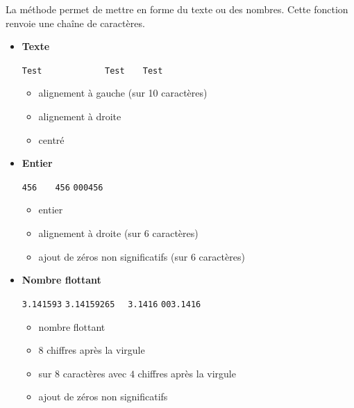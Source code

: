 \documentclass[11pt,class=report,crop=false]{standalone}
\begin{document}
La méthode  permet de mettre en forme du texte ou des nombres. Cette fonction renvoie une chaîne de caractères.

\begin{itemize}
  \item \textbf{Texte}
  
  \begin{center}
 \lstinline[showspaces=true]!Test      ! \qquad\qquad
    \lstinline[showspaces=true]!      Test!  \qquad\qquad
 \lstinline[showspaces=true]!   Test   !   
 \end{center}
 
  \begin{itemize}
    \item {} \quad alignement à gauche (sur 10 caractères)
    \item {} \quad alignement à droite
    \item {} \quad centré 
  \end{itemize}

  \item \textbf{Entier}
  
  \begin{center}
 \lstinline[showspaces=true]!456! \qquad\qquad
    \lstinline[showspaces=true]!   456!  \qquad\qquad
 \lstinline[showspaces=true]!000456!   
 \end{center}
 
  \begin{itemize}
    \item {} \quad entier  
    \item {} \quad alignement à droite (sur 6 caractères)
    \item {} \quad ajout de zéros non significatifs  (sur 6 caractères)
  \end{itemize} 
  
  \item \textbf{Nombre flottant}
  
  \begin{center}
 \lstinline[showspaces=true]!3.141593! \qquad\qquad
    \lstinline[showspaces=true]!3.14159265!  \qquad\qquad
 \lstinline[showspaces=true]!  3.1416!  \qquad\qquad
 \lstinline[showspaces=true]!003.1416!   
 \end{center}
 
  \begin{itemize}
    \item {} \quad nombre flottant 
    \item {} \quad $8$ chiffres après la virgule 
    \item {} \quad sur $8$ caractères avec $4$ chiffres après la virgule 
    \item 
     \quad ajout de zéros non significatifs 
  \end{itemize}   
   
\end{itemize}
\end{document}
